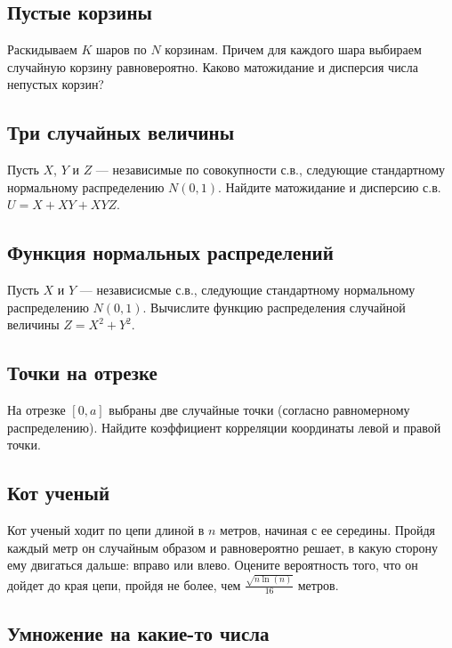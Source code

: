 \documentclass[12pt]{article}
\begin{document}
\subsection{Пустые корзины}

Раскидываем $K$ шаров по $N$ корзинам. Причем для каждого шара выбираем случайную корзину равновероятно. Каково матожидание и дисперсия числа непустых корзин?



\subsection{Три случайных величины}

Пусть $X$, $Y$ и $Z$ --- независимые по совокупности с.в., следующие стандартному нормальному распределению $N(0, 1)$. Найдите матожидание и дисперсию с.в. $U = X + XY + XYZ$. 



\subsection{Функция нормальных распределений}

Пусть $X$ и $Y$ --- независисмые с.в., следующие стандартному нормальному распределению $N(0, 1)$. Вычислите функцию распределения случайной величины $Z = X^2 + Y^2$.



\subsection{Точки на отрезке}

На отрезке $[0, a]$ выбраны две случайные точки (согласно равномерному распределению). Найдите коэффициент корреляции координаты левой и правой точки. 



\subsection{Кот ученый}

Кот ученый ходит по цепи длиной в $n$ метров, начиная с ее середины. Пройдя каждый метр он случайным образом и равновероятно решает, в какую сторону ему двигаться дальше: вправо или влево. Оцените вероятность того, что он дойдет до края цепи, пройдя не более, чем $\frac{\sqrt{n \ln(n)}}{16}$ метров.



\subsection{Умножение на какие-то числа}
\end{document}
